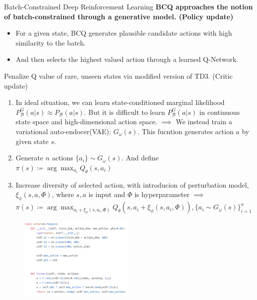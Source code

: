 \documentclass[11pt]{beamer}
\newcommand{\mc}[1]{\mathcal{#1}}
\newcommand{\tb}[1]{\textbf{#1}}
\begin{document}
\begin{frame}{Batch-Constrained Deep Reinforcement Learning}
    \tb{BCQ approaches the notion of batch-constrained through a generative model. (Policy update)}
    \begin{itemize}
        \item For a given state, BCQ generates plausible candidate actions with high similarity to the batch.
        \item And then selects the highest valued action through a learned Q-Network.
    \end{itemize}

    Penalize Q value of rare, unseen states via modified version of TD3. (Critic update)
    \bigskip

    \vfill

    \begin{enumerate}
        \item In ideal situation, we can learn state-conditioned marginal likelihood $P^G_\mc{B}(a|s) \approx P_{\mc{B}}(a|s)$.
        But it is difficult to learn $P^G_\mc{B}(a|s)$ in continuous state space and high-dimensional action space.
        $\implies$ We instead train a variational auto-endocer(VAE): $G_\omega (s)$. This fucntion generates action $a$ by given state $s$.
        \item Generate $n$ actions $\{a_i\} \sim G_\omega (s)$.
        And define $\pi(s) \coloneqq \arg \max_{a_i} Q_\theta (s, a_i)$
        \item Increase diversity of selected action, with introducion of perturbation model, $\xi_\phi(s,a,\Phi)$, where $s,a$ is input and $\Phi$ is hyperparameter
        $\implies$ $\pi(s) \coloneqq \arg \max_{a_i + \xi_\phi(s,a_i, \Phi)} Q_\theta (s,a_i + \xi_\phi (s,a_i, \Phi)), \{a_i \sim G_\omega(s)\}_{i=1}^n$

    \end{enumerate}

    \begin{figure}
        \centering
        \includegraphics[width=0.5\textwidth]{Actor.png}
    \end{figure}
\end{frame}
\end{document}
